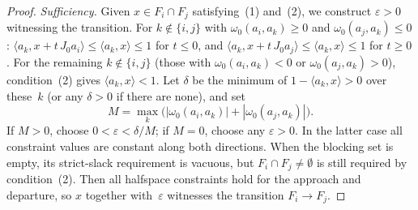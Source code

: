 \begin{unverified}
\begin{proof}
\emph{Sufficiency.}
Given $x \in F_i \cap F_j$ satisfying~(1) and~(2),
we construct $\varepsilon > 0$ witnessing
the transition.
For $k \notin \{i,j\}$ with
$\omega_0(a_i, a_k) \geq 0$ and
$\omega_0(a_j, a_k) \leq 0$:
$\langle a_k, x + t\, J_0 a_i \rangle
\leq \langle a_k, x \rangle \leq 1$
for $t \leq 0$,
and
$\langle a_k, x + t\, J_0 a_j \rangle
\leq \langle a_k, x \rangle \leq 1$
for $t \geq 0$.
For the remaining $k \notin \{i,j\}$
(those with $\omega_0(a_i, a_k) < 0$ or
$\omega_0(a_j, a_k) > 0$),
condition~(2) gives
$\langle a_k, x \rangle < 1$.
Let $\delta$ be the minimum of
$1 - \langle a_k, x \rangle > 0$
over these~$k$ (or any $\delta > 0$ if there are none),
and set
\[
 M = \max_k\bigl(
 |\omega_0(a_i, a_k)| + |\omega_0(a_j, a_k)|\bigr).
\]
If $M>0$, choose $0<\varepsilon<\delta/M$; if $M=0$,
choose any $\varepsilon>0$.  In the latter case all constraint values
are constant along both directions.  When the blocking set is empty,
its strict-slack requirement is vacuous, but $F_i\cap F_j\neq\emptyset$
is still required by condition~(2).
Then all halfspace constraints hold for the
approach and departure, so $x$ together
with~$\varepsilon$ witnesses the transition
$F_i \to F_j$.
\end{proof}
\end{unverified}

